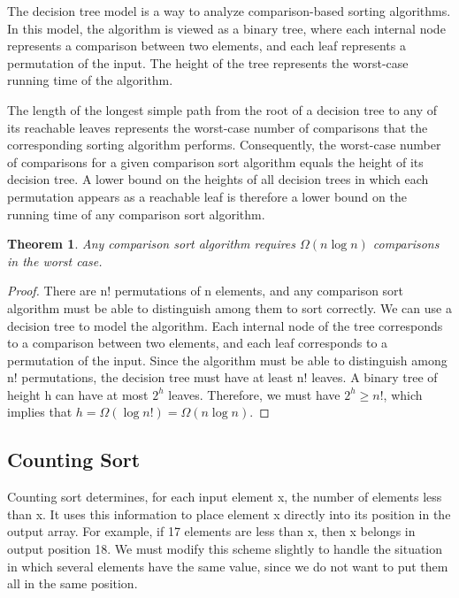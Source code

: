 \begin{definitionblock}
The decision tree model is a way to analyze comparison-based sorting algorithms. In this model, the algorithm is viewed as a binary tree, where each internal node represents a comparison between two elements, and each leaf represents a permutation of the input. The height of the tree represents the worst-case running time of the algorithm.
\end{definitionblock}

The length of the longest simple path from the root of a decision tree to any of its reachable leaves represents the worst-case number of comparisons that the corresponding sorting algorithm performs. Consequently, the worst-case number of comparisons for a given comparison sort algorithm equals the height of its decision
tree. A lower bound on the heights of all decision trees in which each permutation appears as a reachable leaf is therefore a lower bound on the running time of any comparison sort algorithm. 

\newtheorem{theorem}{Theorem}[section]
\begin{theorem}
    Any comparison sort algorithm requires $\Omega(n \log n)$ comparisons in the worst case.
\end{theorem}

\begin{proof}
    There are n! permutations of n elements, and any comparison sort algorithm must be able to distinguish among them to sort correctly. We can use a decision tree to model the algorithm. Each internal node of the tree corresponds to a comparison between two elements, and each leaf corresponds to a permutation of the input. Since the algorithm must be able to distinguish among n! permutations, the decision tree must have at least n! leaves. A binary tree of height h can have at most $2^h$ leaves. Therefore, we must have $2^h \geq n!$, which implies that $h = \Omega(\log n!) = \Omega(n \log n)$.
\end{proof}

\newpage

\subsection{Counting Sort}

Counting sort determines, for each input element x, the number of elements less than x. It uses this information to place element x directly into its position in the output array. For example, if 17 elements are less than x, then x belongs in output position 18. We must modify this scheme slightly to handle the situation in which several elements have the same value, since we do not want to put them all in the same position.

